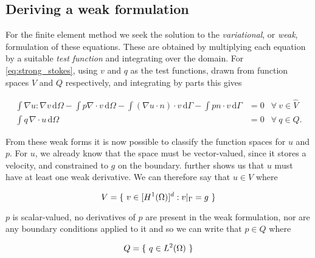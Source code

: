 \documentclass[thesis]{subfiles}
\begin{document}
\subsection{Deriving a weak formulation}

For the finite element method we seek the solution to the \textit{variational}, or \textit{weak}, formulation of these equations.
These are obtained by multiplying each equation by a suitable \textit{test function} and integrating over the domain.
For \cref{eq:strong_stokes}, using $v$ and $q$ as the test functions, drawn from function spaces $\hat V$ and $Q$ respectively, and integrating by parts this gives

\begin{subequations}
  \begin{align}
    \int \nabla u : \nabla v \, \textrm{d}\Omega
    - \int p \nabla \cdot v \, \textrm{d}\Omega
    - \int (\nabla u \cdot n) \cdot v \, \textrm{d}\Gamma
    - \int p n \cdot v \, \textrm{d}\Gamma
    &= 0
    &\forall \ v \in \hat V
    \label{eq:weak_stokes_extra_V} \\
    \int q \, \nabla \cdot u \, \textrm{d}\Omega
    &= 0
    &\forall \ q \in Q.
    \label{eq:weak_stokes_extra_Q}
  \end{align}
  \label{eq:weak_stokes_extra}
\end{subequations}

From these weak forms it is now possible to classify the function spaces for $u$ and $p$.
For $u$, we already know that the space must be vector-valued, since it stores a velocity, and constrained to $g$ on the boundary.
 further shows us that $u$ must have at least one weak derivative.
We can therefore say that $u \in V$ where

\begin{equation*}
  V = \{ \ v \in [H^1(\Omega)]^d : v |_{\Gamma} = g \ \}  \\
\end{equation*}

$p$ is scalar-valued, no derivatives of $p$ are present in the weak formulation, nor are any boundary conditions applied to it and so we can write that $p \in Q$ where

\begin{equation*}
  Q = \{ \ q \in L^2(\Omega) \ \}  \\
\end{equation*}
\end{document}
